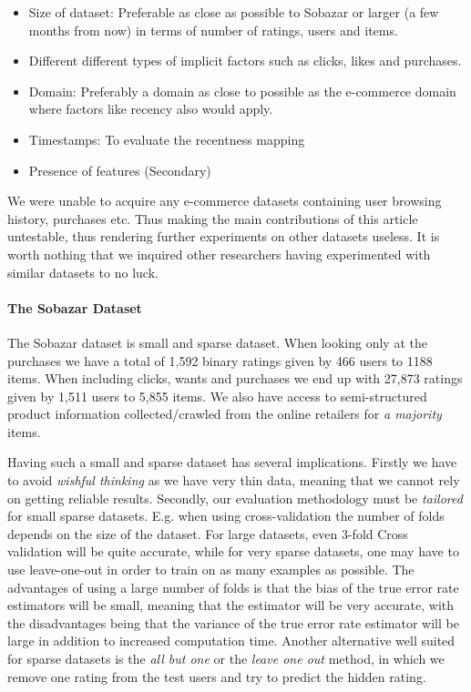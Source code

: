 \begin{itemize}
	\item Size of dataset: Preferable as close as possible to Sobazar or larger (a few months from now)
	in terms of number of ratings, users and items.
	\item Different different types of implicit factors	such as clicks, likes and purchases.
	\item Domain: Preferably a domain as close to possible as the e-commerce domain where
	factors like recency also would apply.
	\item Timestamps: To evaluate the recentness mapping
	\item Presence of features (Secondary)
\end{itemize}

We were unable to acquire any e-commerce datasets containing user browsing history, purchases etc.
Thus making the main contributions of this article untestable, thus rendering further experiments
on other datasets useless. It is worth nothing that we inquired other researchers having
experimented with similar datasets to no luck.

\paragraph{The Sobazar Dataset}

The Sobazar dataset is small and sparse dataset. When looking only at the purchases
we have a total of 1,592 binary ratings given by 466 users to 1188 items. When including
clicks, wants and purchases we end up with 27,873 ratings given by 1,511 users to 5,855 items.
We also have access to semi-structured product information collected/crawled from
the online retailers for \emph{a majority} items.

Having such a small and sparse dataset has several implications. Firstly we have
to avoid \emph{wishful thinking} as we have very thin data, meaning that we cannot
rely on getting reliable results. Secondly, our evaluation methodology must be
\emph{tailored} for small sparse datasets. E.g. when using cross-validation the number
of folds depends on the size of the dataset. For large datasets, even 3-fold Cross
validation will be quite accurate, while for very sparse datasets, one may have to
use leave-one-out in order to train on as many examples as possible. The advantages
of using a large number of folds is that the bias of the true error rate estimators
will be small, meaning that the estimator will be very accurate, with the disadvantages being that
the variance of the true error rate estimator will be large in addition to increased
computation time. Another alternative well suited for sparse datasets is the \emph{all but one} or the
\emph{leave one out} method, in which we remove one rating from the test users
and try to predict the hidden rating.

